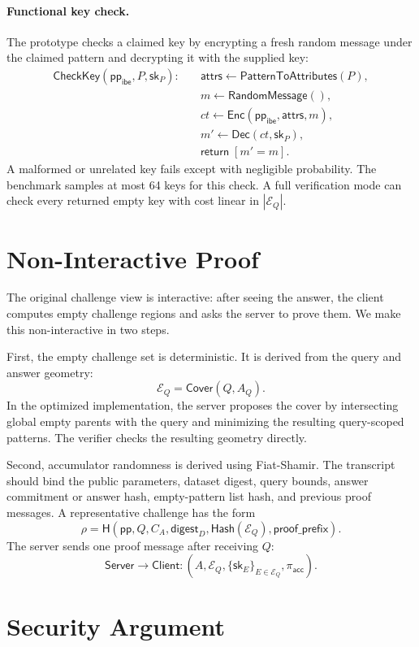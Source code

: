 \documentclass[11pt]{article}
\newcommand{\Enc}{\mathsf{Enc}}
\newcommand{\Dec}{\mathsf{Dec}}
\newcommand{\Cover}{\mathsf{Cover}}
\newcommand{\RO}{\mathsf{H}}
\newcommand{\pp}{\mathsf{pp}}
\newcommand{\sk}{\mathsf{sk}}
\newcommand{\attrs}{\mathsf{attrs}}
\begin{document}
\paragraph{Functional key check.}
The prototype checks a claimed key by encrypting a fresh random message under the claimed pattern and decrypting it with the supplied key:
\[
\begin{aligned}
\mathsf{CheckKey}(\pp_{\mathsf{ibe}},P,\sk_P):\quad
&\attrs \leftarrow \mathsf{PatternToAttributes}(P),\\
&m \leftarrow \mathsf{RandomMessage}(),\\
&ct \leftarrow \Enc(\pp_{\mathsf{ibe}},\attrs,m),\\
&m' \leftarrow \Dec(ct,\sk_P),\\
&\mathsf{return}\; [m'=m].
\end{aligned}
\]
A malformed or unrelated key fails except with negligible probability. The benchmark samples at most 64 keys for this check. A full verification mode can check every returned empty key with cost linear in $|\mathcal{E}_Q|$.

\section{Non-Interactive Proof}

The original challenge view is interactive: after seeing the answer, the client computes empty challenge regions and asks the server to prove them. We make this non-interactive in two steps.

First, the empty challenge set is deterministic. It is derived from the query and answer geometry:
\[
  \mathcal{E}_Q = \Cover(Q,A_Q).
\]
In the optimized implementation, the server proposes the cover by intersecting global empty parents with the query and minimizing the resulting query-scoped patterns. The verifier checks the resulting geometry directly.

Second, accumulator randomness is derived using Fiat-Shamir. The transcript should bind the public parameters, dataset digest, query bounds, answer commitment or answer hash, empty-pattern list hash, and previous proof messages. A representative challenge has the form
\[
  \rho =
  \RO(\pp,Q,C_A,\mathsf{digest}_D,\mathsf{Hash}(\mathcal{E}_Q),\mathsf{proof\_prefix}).
\]
The server sends one proof message after receiving $Q$:
\[
  \mathsf{Server}\rightarrow\mathsf{Client}:
  \left(A,\mathcal{E}_Q,\{\sk_E\}_{E\in\mathcal{E}_Q},\pi_{\mathsf{acc}}\right).
\]

\section{Security Argument}
\end{document}
